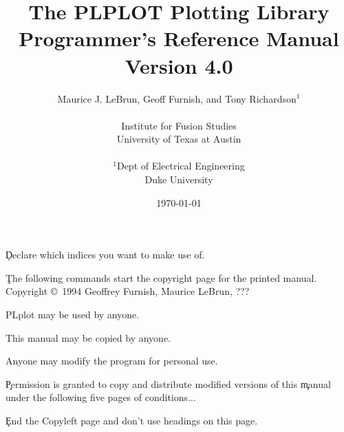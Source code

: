 %
%
%
%
%

\pagestyle{headings}



\c Declare which indices you want to make use of.

\title{ The PLPLOT Plotting Library \\ 
        Programmer's Reference Manual \\
        Version 4.0}
\author{
        Maurice J. LeBrun, 
        Geoff Furnish, and
        Tony Richardson$^1$\\
\\
        Institute for Fusion Studies\\
        University of Texas at Austin\\
        \\
        $^1$Dept of Electrical Engineering\\
        Duke University\\
        }

\date{\today}
\maketitle

\c The following commands start the copyright page for the printed manual.
\clearpage
\vspace{0pt plus 1filll}
Copyright \copyright\ 1994 Geoffrey Furnish, Maurice LeBrun, ???

PLplot may be used by anyone.

This manual may be copied by anyone.

Anyone may modify the program for personal use.

\c Permission is granted to copy and distribute modified versions of this
\c manual under the following five pages of conditions...

\c End the Copyleft page and don't use headings on this page.
\clearpage
\pagestyle{headings}

\tableofcontents

